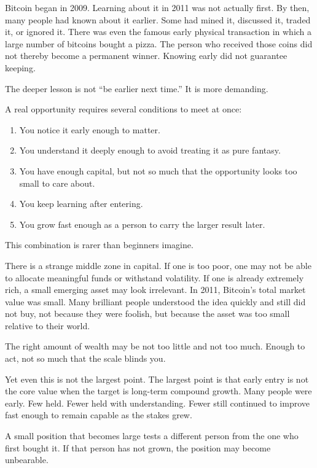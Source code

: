 Bitcoin began in 2009. Learning about it in 2011 was not actually first. By then, many people had known about it earlier. Some had mined it, discussed it, traded it, or ignored it. There was even the famous early physical transaction in which a large number of bitcoins bought a pizza. The person who received those coins did not thereby become a permanent winner. Knowing early did not guarantee keeping.

The deeper lesson is not ``be earlier next time.'' It is more demanding.

A real opportunity requires several conditions to meet at once:

\begin{enumerate}
\item You notice it early enough to matter.
\item You understand it deeply enough to avoid treating it as pure fantasy.
\item You have enough capital, but not so much that the opportunity looks too small to care about.
\item You keep learning after entering.
\item You grow fast enough as a person to carry the larger result later.
\end{enumerate}

This combination is rarer than beginners imagine.

There is a strange middle zone in capital. If one is too poor, one may not be able to allocate meaningful funds or withstand volatility. If one is already extremely rich, a small emerging asset may look irrelevant. In 2011, Bitcoin's total market value was small. Many brilliant people understood the idea quickly and still did not buy, not because they were foolish, but because the asset was too small relative to their world.

The right amount of wealth may be not too little and not too much. Enough to act, not so much that the scale blinds you.

Yet even this is not the largest point. The largest point is that early entry is not the core value when the target is long-term compound growth. Many people were early. Few held. Fewer held with understanding. Fewer still continued to improve fast enough to remain capable as the stakes grew.

A small position that becomes large tests a different person from the one who first bought it. If that person has not grown, the position may become unbearable.

